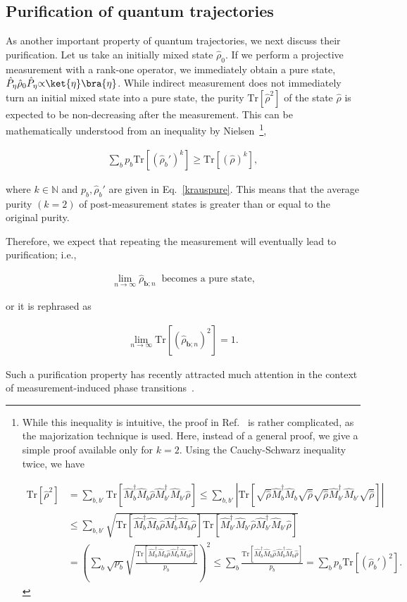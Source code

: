 \documentclass[preprint,pteplogo]{ptephy_v2}%
\numberwithin{equation}{section}
\theoremstyle{definition}
\newcommand{\mr}[1]{\mathrm{#1}}
\newcommand{\mbb}[1]{\mathbb{#1}}
\newcommand{\lrs}[1]{\left( #1 \right)}
\newcommand{\lrl}[1]{\left[ #1 \right]}
\newcommand{\aln}[1]{
\begin{align}
#1
\end{align}
}
\newcommand{\ra}{\rightarrow}
\newcommand{\Tr}{\mr{Tr}}
\begin{document}
\subsection{Purification of quantum trajectories}\label{sec:pur}
As another important property of quantum trajectories, we next discuss their purification.
Let us take an initially mixed state $\hat{\rho}_0$.
If we perform a projective measurement with a rank-one operator, we immediately obtain a pure state, $\hat{P}_\eta\hat{\rho}_0\hat{P}_\eta{\propto}\ket{\eta}\bra{\eta}$.
While indirect measurement does not immediately turn an initial mixed state into a pure state, the purity $\Tr[\hat{\rho}^2]$ of the state $\hat{\rho}$ is expected to be non-decreasing after the measurement. 
This can be mathematically understood from an inequality by Nielsen~\cite{nielsen2001characterizing}\footnote{
While this inequality is intuitive, the proof in Ref.~\cite{nielsen2001characterizing} is rather complicated, as the majorization technique is used. 
Here, instead of a general proof, we give a simple proof available only for $k=2$. 
Using the Cauchy-Schwarz inequality twice, we have
\aln{
\Tr[\hat{\rho}^2]&=\sum_{b,b'}\Tr[\hat{M}_b^\dag\hat{M}_b\hat{\rho}\hat{M}_{b'}^\dag\hat{M}_{b'}\hat{\rho}]\leq \sum_{b,b'}|\Tr[\sqrt{\hat{\rho}}\hat{M}_b^\dag\hat{M}_b\sqrt{\hat{\rho}}\sqrt{\hat{\rho}}\hat{M}_{b'}^\dag\hat{M}_{b'}\sqrt{\hat{\rho}}]|
\nonumber\\
&\leq \sum_{b,b'}\sqrt{\Tr[\hat{M}_b^\dag\hat{M}_b\hat{\rho}\hat{M}_{b}^\dag\hat{M}_{b}\hat{\rho}]\Tr[\hat{M}_{b'}^\dag\hat{M}_{b'}\hat{\rho}\hat{M}_{b'}^\dag\hat{M}_{b'}\hat{\rho}]}\nonumber\\
&=\lrs{\sum_b\sqrt{p_b}\sqrt{\frac{\Tr[\hat{M}_b^\dag\hat{M}_b\hat{\rho}\hat{M}_{b}^\dag\hat{M}_{b}\hat{\rho}]}{p_b}}}^2 
\leq \sum_b\frac{\Tr[\hat{M}_b^\dag\hat{M}_b\hat{\rho}\hat{M}_{b}^\dag\hat{M}_{b}\hat{\rho}]}{p_b}=\sum_b p_b\Tr[(\hat{\rho}_b')^2].
}
},
\aln{
\sum_bp_b\Tr[(\hat{\rho}_b')^k]\geq \Tr[(\hat{\rho})^k],
}
where $k\in \mbb{N}$ and $p_b,\hat{\rho}_b'$ are given in Eq.~\eqref{krauspure}.
This means that the average purity $(k=2)$ of post-measurement states is greater than or equal to the original purity.

Therefore, we expect that repeating the measurement will eventually lead to purification; i.e.,
\aln{\label{eq:purification}
\lim_{n\ra\infty}\hat{\rho}_{\bm{b};n}\;\;\text{becomes a pure state,}
}
or it is rephrased as
\aln{
\lim_{n\ra\infty}\Tr\lrl{\lrs{\hat{\rho}_{\bm{b};n}}^2}=1.
}
Such a purification property has recently attracted much attention in the context of measurement-induced phase transitions~\cite{gullans2020dynamical}.
\end{document}
